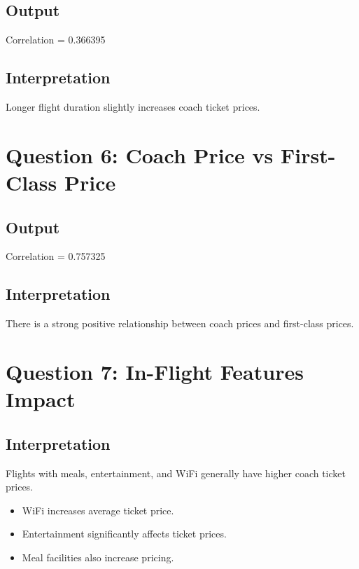 \documentclass[12pt,a4paper]{article}
\begin{document}
\subsection{Output}

\begin{tcolorbox}[colback=lightblue]
Correlation = 0.366395
\end{tcolorbox}

\subsection{Interpretation}

Longer flight duration slightly increases coach ticket prices.

\section{Question 6: Coach Price vs First-Class Price}

\subsection{Output}

\begin{tcolorbox}[colback=lightblue]
Correlation = 0.757325
\end{tcolorbox}

\subsection{Interpretation}

There is a strong positive relationship between coach prices and first-class prices.

\section{Question 7: In-Flight Features Impact}

\subsection{Interpretation}

Flights with meals, entertainment, and WiFi generally have higher coach ticket prices.

\begin{itemize}
    \item WiFi increases average ticket price.
    \item Entertainment significantly affects ticket prices.
    \item Meal facilities also increase pricing.
\end{itemize}
\end{document}

